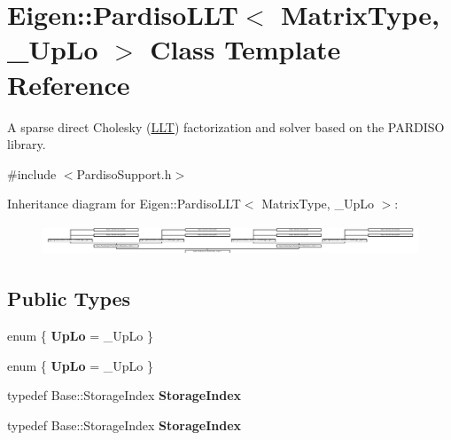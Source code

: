 \hypertarget{class_eigen_1_1_pardiso_l_l_t}{}\section{Eigen\+:\+:Pardiso\+L\+LT$<$ Matrix\+Type, \+\_\+\+Up\+Lo $>$ Class Template Reference}
\label{class_eigen_1_1_pardiso_l_l_t}


A sparse direct Cholesky (\hyperlink{group___cholesky___module_class_eigen_1_1_l_l_t}{L\+LT}) factorization and solver based on the P\+A\+R\+D\+I\+SO library.  




{\ttfamily \#include $<$Pardiso\+Support.\+h$>$}

Inheritance diagram for Eigen\+:\+:Pardiso\+L\+LT$<$ Matrix\+Type, \+\_\+\+Up\+Lo $>$\+:\begin{figure}[H]
\begin{center}
\leavevmode
\includegraphics[height=0.913838cm]{class_eigen_1_1_pardiso_l_l_t}
\end{center}
\end{figure}
\subsection*{Public Types}
\begin{DoxyCompactItemize}
\item 
\mbox{\label{class_eigen_1_1_pardiso_l_l_t_af8476ff09160b938a4104fdfd5ffb74b}} 
enum \{ {\bfseries Up\+Lo} = \+\_\+\+Up\+Lo
 \}
\item 
\mbox{\label{class_eigen_1_1_pardiso_l_l_t_af4094b5e03c03ff07ae311ee376df849}} 
enum \{ {\bfseries Up\+Lo} = \+\_\+\+Up\+Lo
 \}
\item 
\mbox{\label{class_eigen_1_1_pardiso_l_l_t_a829a43ab724a0b622adccc2101016261}} 
typedef Base\+::\+Storage\+Index {\bfseries Storage\+Index}
\item 
\mbox{\label{class_eigen_1_1_pardiso_l_l_t_a829a43ab724a0b622adccc2101016261}} 
typedef Base\+::\+Storage\+Index {\bfseries Storage\+Index}
\end{DoxyCompactItemize}
